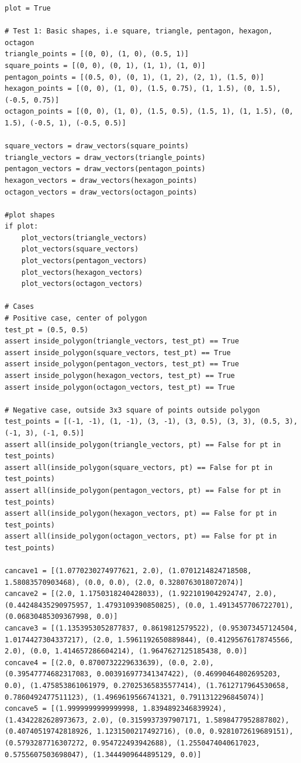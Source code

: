 \documentclass{labReport}
\begin{document}
\begin{verbatim}
plot = True

# Test 1: Basic shapes, i.e square, triangle, pentagon, hexagon, octagon
triangle_points = [(0, 0), (1, 0), (0.5, 1)]
square_points = [(0, 0), (0, 1), (1, 1), (1, 0)]
pentagon_points = [(0.5, 0), (0, 1), (1, 2), (2, 1), (1.5, 0)]
hexagon_points = [(0, 0), (1, 0), (1.5, 0.75), (1, 1.5), (0, 1.5), (-0.5, 0.75)]
octagon_points = [(0, 0), (1, 0), (1.5, 0.5), (1.5, 1), (1, 1.5), (0, 1.5), (-0.5, 1), (-0.5, 0.5)]

square_vectors = draw_vectors(square_points)
triangle_vectors = draw_vectors(triangle_points)
pentagon_vectors = draw_vectors(pentagon_points)
hexagon_vectors = draw_vectors(hexagon_points)
octagon_vectors = draw_vectors(octagon_points)

#plot shapes
if plot:
    plot_vectors(triangle_vectors)
    plot_vectors(square_vectors)
    plot_vectors(pentagon_vectors)
    plot_vectors(hexagon_vectors)
    plot_vectors(octagon_vectors)

# Cases
# Positive case, center of polygon
test_pt = (0.5, 0.5)
assert inside_polygon(triangle_vectors, test_pt) == True
assert inside_polygon(square_vectors, test_pt) == True
assert inside_polygon(pentagon_vectors, test_pt) == True
assert inside_polygon(hexagon_vectors, test_pt) == True
assert inside_polygon(octagon_vectors, test_pt) == True

# Negative case, outside 3x3 square of points outside polygon
test_points = [(-1, -1), (1, -1), (3, -1), (3, 0.5), (3, 3), (0.5, 3), (-1, 3), (-1, 0.5)]
assert all(inside_polygon(triangle_vectors, pt) == False for pt in test_points)
assert all(inside_polygon(square_vectors, pt) == False for pt in test_points)
assert all(inside_polygon(pentagon_vectors, pt) == False for pt in test_points)
assert all(inside_polygon(hexagon_vectors, pt) == False for pt in test_points)
assert all(inside_polygon(octagon_vectors, pt) == False for pt in test_points)

cancave1 = [(1.0770230274977621, 2.0), (1.0701214824718508, 1.58083570903468), (0.0, 0.0), (2.0, 0.3280763018072074)]
cancave2 = [(2.0, 1.1750318240428033), (1.9221019042924747, 2.0), (0.44248435290975957, 1.4793109390850825), (0.0, 1.4913457706722701), (0.06830485309367998, 0.0)]
cancave3 = [(1.1353953052877837, 0.8619812579522), (0.953073457124504, 1.0174427304337217), (2.0, 1.5961192650889844), (0.41295676178745566, 2.0), (0.0, 1.414657286604214), (1.9647627125185438, 0.0)]
concave4 = [(2.0, 0.8700732229633639), (0.0, 2.0), (0.39547774682317083, 0.003916977341347422), (0.46990464802695203, 0.0), (1.475853861061979, 0.27025365835577414), (1.7612717964530658, 0.7860492477511123), (1.4969619566741321, 0.7911312296845074)]
concave5 = [(1.9999999999999998, 1.8394892346839924), (1.4342282628973673, 2.0), (0.3159937397907171, 1.5898477952887802), (0.40740519742818926, 1.1231500217492716), (0.0, 0.9281072619689151), (0.5793287716307272, 0.954722493942688), (1.2550474040617023, 0.5755607503698047), (1.3444909644895129, 0.0)]


\end{verbatim}
\end{document}
